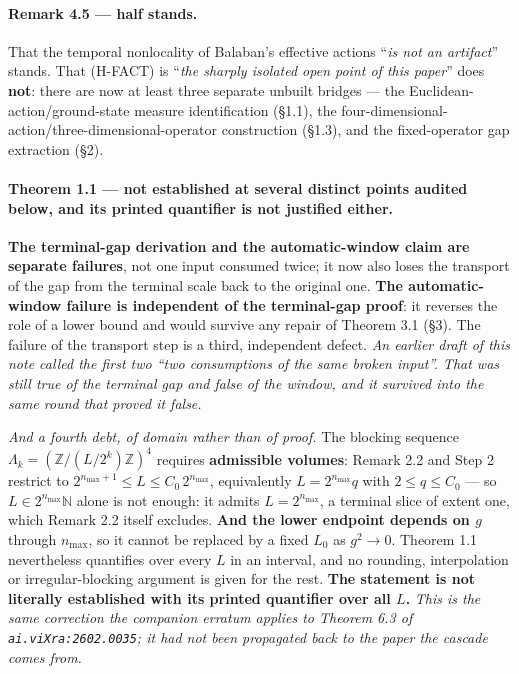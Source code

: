 \documentclass[11pt]{article}
\begin{document}
\paragraph{Remark 4.5 --- half stands.} That the temporal nonlocality of Balaban's
effective actions ``\emph{is not an artifact}'' stands. That (H-FACT) is
``\emph{the sharply isolated open point of this paper}'' does \textbf{not}: there are
now at least three separate unbuilt bridges --- the Euclidean-action/ground-state
measure identification (\S1.1), the four-dimensional-action/three-dimensional-operator
construction (\S1.3), and the fixed-operator gap extraction (\S2).

\paragraph{Theorem 1.1 --- not established at several distinct points audited
below, and its printed quantifier is not justified either.} \textbf{The terminal-gap
derivation and the automatic-window claim are separate failures}, not one input
consumed twice; it now also loses the transport of the gap from the terminal scale
back to the original one. \textbf{The automatic-window failure is independent of the
terminal-gap proof}: it
reverses the role of a lower bound and would survive any repair of Theorem 3.1
(\S3). The failure of the transport step is a third, independent defect.
\emph{An earlier draft of this note called the first two ``two consumptions of the
same broken input''. That was still true of the terminal gap and false of the
window, and it survived into the same round that proved it false.}

\emph{And a fourth debt, of domain rather than of proof.} The blocking sequence
$\Lambda_k=(\mathbb Z/(L/2^k)\mathbb Z)^4$ requires \textbf{admissible volumes}:
Remark 2.2 and Step 2 restrict to \textbf{$2^{n_{\max}+1}\le L\le C_0\,2^{n_{\max}}$},
equivalently $L=2^{n_{\max}}q$ with $2\le q\le C_0$ --- so $L\in2^{n_{\max}}\mathbb N$
alone is not enough: it admits $L=2^{n_{\max}}$, a terminal slice of extent one, which
Remark 2.2 itself excludes. \textbf{And the lower endpoint depends on $g$} through
$n_{\max}$, so it cannot be replaced by a fixed $L_0$ as $g^2\to0$. Theorem 1.1 nevertheless quantifies
over every $L$ in an interval, and no rounding, interpolation or irregular-blocking
argument is given for the rest. \textbf{The statement is not literally established
with its printed quantifier over all $L$.} \emph{This is the same correction the
companion erratum applies to Theorem 6.3 of \texttt{ai.viXra:2602.0035}; it had not
been propagated back to the paper the cascade comes from.}
\end{document}
